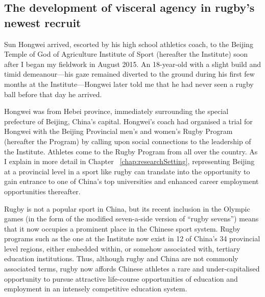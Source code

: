 

                                  \begin{CJK}{UTF8}{gbsn}

\section{The development of visceral agency in rugby's newest recruit\label{sect:SHW}}
Sun Hongwei arrived, escorted by his high school athletics coach, to the Beijing Temple of God of Agriculture Institute of Sport (hereafter the Institute) soon after I began my fieldwork in August 2015.  An 18-year-old with a slight build and timid demeanour---his gaze remained diverted to the ground during his first few months at the Institute---Hongwei later told me that he had never seen a rugby ball before that day he arrived.

Hongwei was from Hebei province, immediately surrounding the special prefecture of Beijing, China's capital.  Hongwei's coach had organised a trial for Hongwei with the Beijing Provincial men’s and women's Rugby Program (hereafter the Program) by calling upon social connections to the leadership of the Institute.  Athletes come to the Rugby Program from all over the country.  As I explain in more detail in Chapter ~\ref{chap:researchSetting}, representing Beijing at a provincial level in a sport like rugby can translate into the opportunity to gain entrance to one of China's top universities and enhanced career employment opportunities thereafter.

Rugby is not a popular sport in China, but its recent inclusion in the Olympic games (in the form of the modified seven-a-side version of ``rugby sevens'') means that it now occupies a prominent place in the Chinese sport system.  Rugby programs such as the one at the Institute now exist in 12 of China's 34 provincial level regions, either embedded within, or somehow associated with, tertiary education institutions.  Thus, although rugby and China are not commonly associated terms, rugby now affords Chinese athletes a rare and under-capitalised opportunity to pursue attractive life-course opportunities of education and employment in an intensely competitive education system.


\end{CJK}
